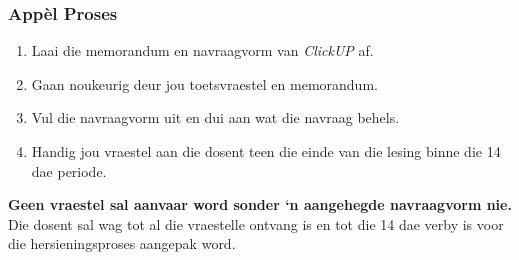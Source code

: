     \subsubsection{App\`{e}l Proses}
        \begin{enumerate}
            \item Laai die memorandum en navraagvorm van \textit{ClickUP} af.
            \item Gaan noukeurig deur jou toetsvraestel en memorandum.
            \item Vul die navraagvorm uit en dui aan wat die navraag behels.
            \item Handig jou vraestel aan die dosent teen die einde van die
                lesing binne die 14 dae periode.
        \end{enumerate}

        \textbf{Geen vraestel sal aanvaar word sonder `n aangehegde navraagvorm
        nie.}  Die dosent sal wag tot al die vraestelle ontvang is en tot die
        14 dae verby is voor die hersieningsproses aangepak word.
